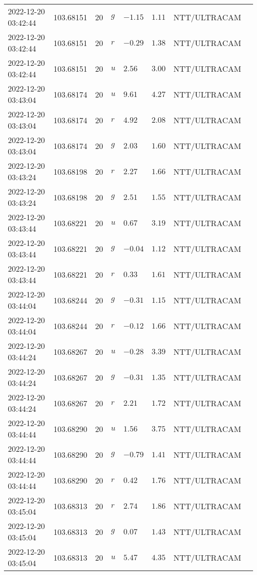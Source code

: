 \documentclass{nature_plusfigure}
\begin{document}
\begin{supplement}
\begin{center}
\begin{longtable}{llllllll}
2022-12-20 03:42:44 & 103.68151 & 20 & $g$ & $-1.15$ & $1.11$ & NTT/ULTRACAM &  \\ 
2022-12-20 03:42:44 & 103.68151 & 20 & $r$ & $-0.29$ & $1.38$ & NTT/ULTRACAM &  \\ 
2022-12-20 03:42:44 & 103.68151 & 20 & $u$ & $2.56$ & $3.00$ & NTT/ULTRACAM &  \\ 
2022-12-20 03:43:04 & 103.68174 & 20 & $u$ & $9.61$ & $4.27$ & NTT/ULTRACAM &  \\ 
2022-12-20 03:43:04 & 103.68174 & 20 & $r$ & $4.92$ & $2.08$ & NTT/ULTRACAM &  \\ 
2022-12-20 03:43:04 & 103.68174 & 20 & $g$ & $2.03$ & $1.60$ & NTT/ULTRACAM &  \\ 
2022-12-20 03:43:24 & 103.68198 & 20 & $r$ & $2.27$ & $1.66$ & NTT/ULTRACAM &  \\ 
2022-12-20 03:43:24 & 103.68198 & 20 & $g$ & $2.51$ & $1.55$ & NTT/ULTRACAM &  \\ 
2022-12-20 03:43:44 & 103.68221 & 20 & $u$ & $0.67$ & $3.19$ & NTT/ULTRACAM &  \\ 
2022-12-20 03:43:44 & 103.68221 & 20 & $g$ & $-0.04$ & $1.12$ & NTT/ULTRACAM &  \\ 
2022-12-20 03:43:44 & 103.68221 & 20 & $r$ & $0.33$ & $1.61$ & NTT/ULTRACAM &  \\ 
2022-12-20 03:44:04 & 103.68244 & 20 & $g$ & $-0.31$ & $1.15$ & NTT/ULTRACAM &  \\ 
2022-12-20 03:44:04 & 103.68244 & 20 & $r$ & $-0.12$ & $1.66$ & NTT/ULTRACAM &  \\ 
2022-12-20 03:44:24 & 103.68267 & 20 & $u$ & $-0.28$ & $3.39$ & NTT/ULTRACAM &  \\ 
2022-12-20 03:44:24 & 103.68267 & 20 & $g$ & $-0.31$ & $1.35$ & NTT/ULTRACAM &  \\ 
2022-12-20 03:44:24 & 103.68267 & 20 & $r$ & $2.21$ & $1.72$ & NTT/ULTRACAM &  \\ 
2022-12-20 03:44:44 & 103.68290 & 20 & $u$ & $1.56$ & $3.75$ & NTT/ULTRACAM &  \\ 
2022-12-20 03:44:44 & 103.68290 & 20 & $g$ & $-0.79$ & $1.41$ & NTT/ULTRACAM &  \\ 
2022-12-20 03:44:44 & 103.68290 & 20 & $r$ & $0.42$ & $1.76$ & NTT/ULTRACAM &  \\ 
2022-12-20 03:45:04 & 103.68313 & 20 & $r$ & $2.74$ & $1.86$ & NTT/ULTRACAM &  \\ 
2022-12-20 03:45:04 & 103.68313 & 20 & $g$ & $0.07$ & $1.43$ & NTT/ULTRACAM &  \\ 
2022-12-20 03:45:04 & 103.68313 & 20 & $u$ & $5.47$ & $4.35$ & NTT/ULTRACAM &  \\ 

\end{longtable}
\end{center}
\end{supplement}
\end{document}
